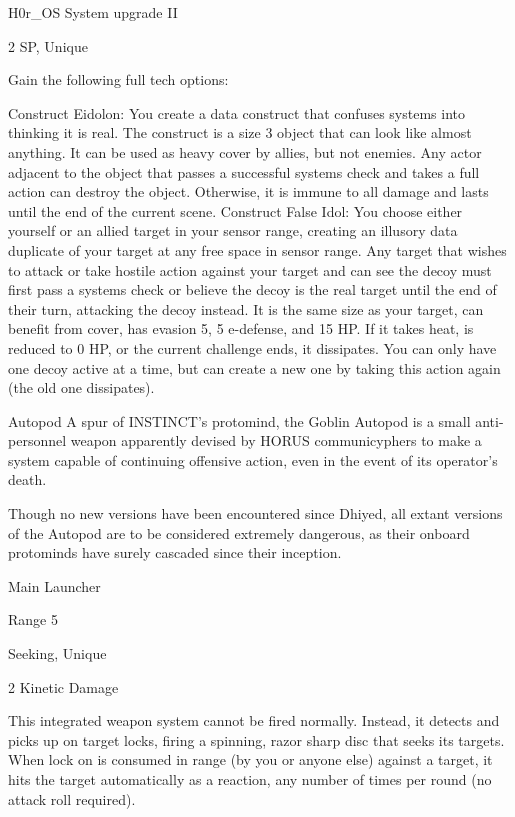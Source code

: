 H0r\_OS System upgrade II   

2 SP, Unique  

Gain the following full tech options:
 
        Construct Eidolon: You create a data construct that confuses systems into thinking it is  
         real. The construct is a size 3 object that can look like almost anything. It can be used as  
         heavy cover by allies, but not enemies. Any actor adjacent to the object that passes a  
        successful systems check and takes a full action can destroy the object. Otherwise, it is  
         immune to all damage and lasts until the end of the current scene.  
        Construct False Idol: You choose either yourself or an allied target in your sensor range,  
        creating an illusory data duplicate of your target at any free space in sensor range. Any  
        target that wishes to attack or take hostile action against your target and can see the  
        decoy must first pass a systems check or believe the decoy is the real target until the end  
        of their turn, attacking the decoy instead. It is the same size as your target, can benefit  
        from cover, has evasion 5, 5 e-defense, and 15 HP. If it takes heat, is reduced to 0 HP, or  
        the current challenge ends, it dissipates. You can only have one decoy active at a time,  
         but can create a new one by taking this action again (the old one dissipates).
 

Autopod  
A spur of INSTINCT’s protomind, the Goblin Autopod is a small anti-personnel weapon apparently  
devised by HORUS communicyphers to make a system capable of continuing offensive action,  
even in the event of its operator’s death.   

Though no new versions have been encountered since Dhiyed, all extant versions of the Autopod  
are to be considered extremely dangerous, as their onboard protominds have surely cascaded  
since their inception.  

Main Launcher
 

                                                                                                           


Range 5
 
Seeking, Unique
 
2 Kinetic Damage
 
This integrated weapon system cannot be fired normally. Instead, it detects and picks up on  
target locks, firing a spinning, razor sharp disc that seeks its targets. When lock on is consumed  
in range (by you or anyone else) against a target, it hits the target automatically as a reaction, any  
number of times per round (no attack roll required).  

